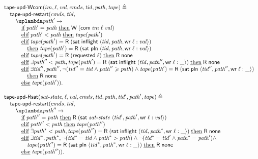 {\[
\begin{array}{l}
\tapeUpdWcom(im, \loc, \stval, \Carm, \tId, \cpath, \tape) \triangleq \\
\quad \tapeUpdRestart(\Carm, \tId, \\
\qquad \lambda \cpath' -> \\
\qquad \quad \textIf   \cpath' = \cpath \; \textThen \tapeWrite{(\tapeWriteCommitted{im}{\loc}{\stval})} \\
\qquad \quad \textElif \cpath' < \cpath \; \textThen \tape(\cpath') \\
\qquad \quad \textElif \tape(\cpath') = \tapeRead{(\tapeSatisfied{\SatisfiedInFlight}{\stRequestWrite{\tId}{ \cpath}{\loc}{\stval}})}
            \\
\qquad \qquad \textThen \tape(\cpath') = \tapeRead{(\tapeSatisfied{\Plain}{\stRequestWrite{\tId}{ \cpath}{\loc}{\stval}})} \\
\qquad \quad \textElif \tape(\cpath') = \tapeRead{(\Issued{\loc})} \; \textThen \tapeRead{\None} \\
\qquad \quad \textElif \exists \cpath'' < \cpath,
                      \tape(\cpath') =\tapeRead{(\tapeSatisfied{\SatisfiedInFlight}{\stRequestWrite{\tId}{ \cpath''}{\loc}{\_}})}
                      \; \textThen \tapeRead{\None} \\
\qquad \quad \textElif \exists \tId'', \cpath'', \lnot (\tId'' = \tId \land \cpath'' \ge \cpath) \land
                      \tape(\cpath') =\tapeRead{(\tapeSatisfied{\Plain}{\stRequestWrite{\tId''}{ \cpath''}{\loc}{\_}})}
                      \\
\qquad \qquad \textThen \tapeRead{\None} \\
\qquad \quad \textElse \tape(\cpath')). \\
\\
\tapeUpdRsat(\satisfiedState, \loc, \stval, \Carm, \tId, \cpath, \tId', \cpath', \tape) \triangleq \\
\quad \tapeUpdRestart(\Carm, \tId, \\
\qquad \lambda \cpath'' -> \\
\qquad \quad \textIf   \cpath'' = \cpath \;
                  \textThen \tapeRead{(\tapeSatisfied{\satisfiedState}{\stRequestWrite{\tId'}{ \cpath'}{\loc}{\stval}})} \\
\qquad \quad \textElif \cpath'' < \cpath \; \textThen \tape(\cpath'') \\
\qquad \quad \textElif \exists \cpath^{*} < \cpath,
                  \tape(\cpath'') = \tapeRead{(\tapeSatisfied{\SatisfiedInFlight}{\stRequestWrite{\tId}{ \cpath^{*}}{\loc}{\_}})}
                  \; \textThen \tapeRead{\None} \\
\qquad \quad \textElif \exists \tId^{*}, \cpath^{*},
                  \lnot (\tId^{*} = \tId  \land \cpath^{*} > \cpath ) \land
                  \lnot (\tId^{*} = \tId' \land \cpath^{*} = \cpath') \land \\
\qquad \qquad \tape(\cpath'') = \tapeRead{(\tapeSatisfied{\Plain}{\stRequestWrite{\tId^{*}}{ \cpath^{*}}{\loc}{\_}})}
                  \; \textThen \tapeRead{\None} \\
\qquad \quad \textElse \tape(\cpath'')).
\end{array}
\]

}

